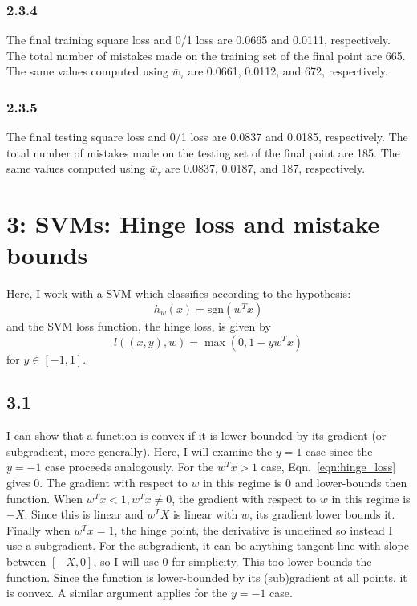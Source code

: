 \documentclass[12pt]{amsart}
\begin{document}
\subsubsection*{2.3.4}
The final training square loss and 0/1 loss are 0.0665 and 0.0111, respectively.  The total number of mistakes made on the training set of the final point are 665.  The same values computed using $\bar{w}_{\tau}$ are 0.0661, 0.0112, and 672, respectively.

\subsubsection*{2.3.5}
The final testing square loss and 0/1 loss are 0.0837 and 0.0185, respectively.  The total number of mistakes made on the testing set of the final point are 185.  The same values computed using $\bar{w}_{\tau}$ are 0.0837, 0.0187, and 187, respectively.

\section*{3: SVMs: Hinge loss and mistake bounds}

Here, I work with a SVM which classifies according to the hypothesis:
\begin{equation} \label{eqn:svm}
h_w(x) = \text{sgn}(w^Tx)
\end{equation}
and the SVM loss function, the hinge loss, is given by
\begin{equation} \label{eqn:hinge_loss}
l((x,y),w) = \max(0,1 - yw^Tx)
\end{equation}
for $y \in [-1,1]$.

\subsection*{3.1}

I can show that a function is convex if it is lower-bounded by its gradient (or subgradient, more generally).  Here, I will examine the $y = 1$ case since the $y = -1$ case proceeds analogously.   For the $w^Tx > 1$ case, Eqn.~\ref{eqn:hinge_loss} gives 0.  The gradient with respect to $w$ in this regime is 0 and lower-bounds then function.  When $w^Tx < 1, w^Tx \neq 0$, the gradient with respect to $w$ in this regime is $-X$.  Since this is linear and $w^TX$ is linear with $w$, its gradient lower bounds it.  Finally when $w^Tx = 1$, the hinge point, the derivative is undefined so instead I use a subgradient.  For the subgradient, it can be anything tangent line with slope between $[-X,0]$, so I will use 0 for simplicity.  This too lower bounds the function.  Since the function is lower-bounded by its (sub)gradient at all points, it is convex.  A similar argument applies for the $y = -1$ case.
\end{document}
